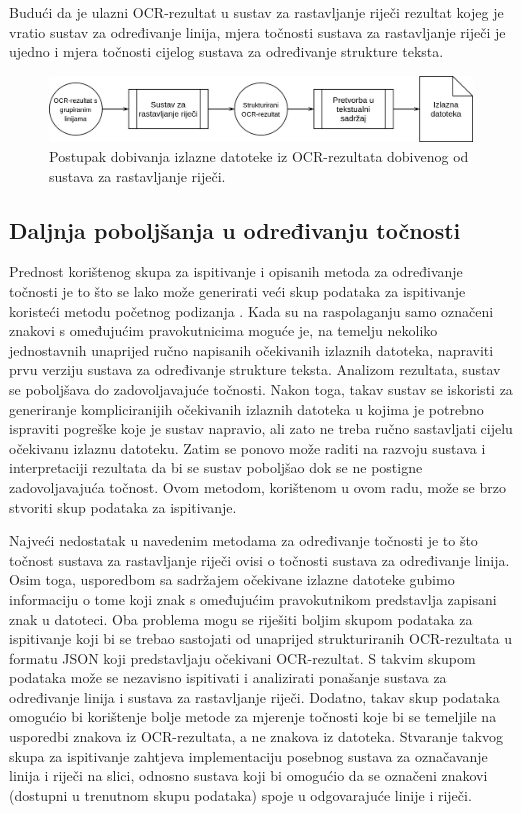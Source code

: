 \documentclass[times, utf8, zavrsni]{fer}
\begin{document}
Budući da je ulazni OCR-rezultat u sustav za rastavljanje riječi rezultat
kojeg je vratio sustav za određivanje linija, mjera točnosti sustava za
rastavljanje riječi je ujedno i mjera točnosti cijelog sustava za određivanje
strukture teksta.

\begin{figure}[htb]
    \centering
    \captionsetup{justification=centering,margin=2cm}
    \includegraphics[width=\textwidth]{images/sustav-05.png}
    \caption{
        Postupak dobivanja izlazne datoteke iz OCR-rezultata dobivenog od
        sustava za rastavljanje riječi.
    }
    \label{fig:sustav-05}
\end{figure}

\subsection{Daljnja poboljšanja u određivanju točnosti}
Prednost korištenog skupa za ispitivanje i opisanih metoda za određivanje
točnosti je to što se lako može generirati veći skup podataka za ispitivanje
koristeći metodu početnog podizanja . Kada su na
raspolaganju samo označeni znakovi s omeđujućim pravokutnicima moguće je, na
temelju nekoliko jednostavnih unaprijed ručno napisanih očekivanih izlaznih
datoteka, napraviti prvu verziju sustava za određivanje strukture teksta.
Analizom rezultata, sustav se poboljšava do zadovoljavajuće točnosti. Nakon
toga, takav sustav se iskoristi za generiranje kompliciranijih očekivanih
izlaznih datoteka u kojima je potrebno ispraviti pogreške koje je sustav
napravio, ali zato ne treba ručno sastavljati cijelu očekivanu izlaznu
datoteku. Zatim se ponovo može raditi na razvoju sustava i interpretaciji
rezultata da bi se sustav poboljšao dok se ne postigne zadovoljavajuća točnost.
Ovom metodom, korištenom u ovom radu, može se brzo stvoriti skup podataka za
ispitivanje.

Najveći nedostatak u navedenim metodama za određivanje točnosti je to što
točnost sustava za rastavljanje riječi ovisi o točnosti sustava za određivanje
linija. Osim toga, usporedbom sa sadržajem očekivane izlazne datoteke gubimo
informaciju o tome koji znak s omeđujućim pravokutnikom predstavlja zapisani
znak u datoteci. Oba problema mogu se riješiti boljim skupom podataka za
ispitivanje koji bi se trebao sastojati od unaprijed strukturiranih
OCR-rezultata u formatu JSON koji predstavljaju očekivani OCR-rezultat. S
takvim skupom podataka može se nezavisno ispitivati i analizirati ponašanje
sustava za određivanje linija i sustava za rastavljanje riječi. Dodatno, takav
skup podataka omogućio bi korištenje bolje metode za mjerenje točnosti koje bi
se temeljile na usporedbi znakova iz OCR-rezultata, a ne znakova iz datoteka.
Stvaranje takvog skupa za ispitivanje zahtjeva implementaciju posebnog sustava
za označavanje linija i riječi na slici, odnosno sustava koji bi omogućio da
se označeni znakovi (dostupni u trenutnom skupu podataka) spoje u odgovarajuće
linije i riječi.
\end{document}
